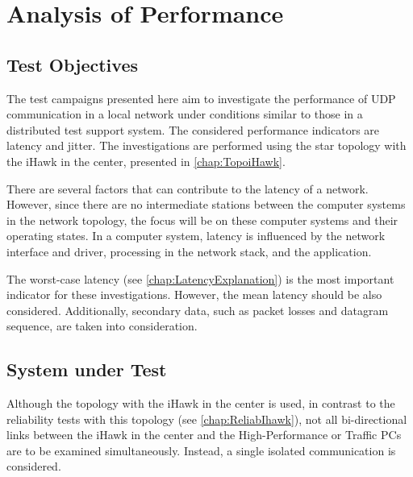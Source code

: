 \chapter{Analysis of Performance}

\section{Test Objectives}
The test campaigns presented here aim to investigate the performance of UDP communication in a local network under conditions similar to those in a distributed test support system. The considered performance indicators are latency and jitter. The investigations are performed using the star topology with the iHawk in the center, presented in \ref{chap:TopoiHawk}.

There are several factors that can contribute to the latency of a network. However, since there are no intermediate stations between the computer systems in the network topology, the focus will be on these computer systems and their operating states. In a computer system, latency is influenced by the network interface and driver, processing in the network stack, and the application.

The worst-case latency (see \ref{chap:LatencyExplanation}) is the most important indicator for these investigations. However, the mean latency should be also considered. Additionally, secondary data, such as packet losses and datagram sequence, are taken into consideration.

\section{System under Test}
Although the topology with the iHawk in the center is used, in contrast to the reliability tests with this topology (see \ref{chap:ReliabIhawk}), not all bi-directional links between the iHawk in the center and the High-Performance or Traffic PCs are to be examined simultaneously. Instead, a single isolated communication is considered.

